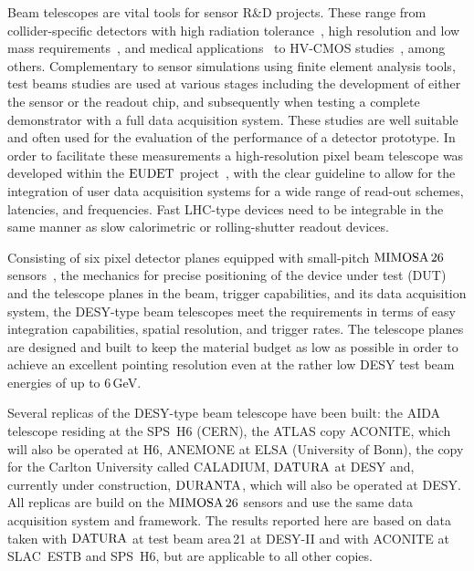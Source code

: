 

Beam telescopes are vital tools for sensor R\&D projects. 
These range from collider-specific detectors with high radiation tolerance~\cite{1748-0221-9-12-C12001,1748-0221-9-12-C12029},
 high resolution and low mass requirements~\cite{1748-0221-10-03-C03044}, and medical applications~\cite{Ballabriga2011S15} to HV-CMOS studies~\cite{1748-0221-7-08-C08002}, among others.
Complementary to sensor simulations using finite element analysis tools, test beams studies are used at various stages including the development of either the sensor or the readout chip,
 and subsequently when testing a complete demonstrator with a full data acquisition system. 
These studies are well suitable and often used for the evaluation of the performance of a detector prototype. %
In order to facilitate these measurements a high-resolution pixel beam telescope was developed within the $\textrm{EUDET}$ project~\cite{ref:eudetreport200902},
 with the clear guideline to allow for the integration of user data acquisition systems for a wide range of read-out schemes, latencies, and frequencies. 
Fast LHC-type devices need to be integrable in the same manner as slow calorimetric or rolling-shutter readout devices. 

Consisting of six pixel detector planes equipped with small-pitch $\textrm{MIMOSA\,26}$ sensors~\cite{HuGuo2010480},
 the mechanics for precise positioning of the device under test (DUT) and the telescope planes in the beam, trigger capabilities, and its data acquisition system, 
 the DESY-type beam telescopes meet the requirements in terms of easy integration capabilities, spatial resolution, and trigger rates. 
The telescope planes are designed and built to keep the material budget as low as possible in order to achieve an excellent pointing resolution
 even at the rather low DESY test beam energies of up to 6\,GeV.

Several replicas of the DESY-type beam telescope have been built:
 the AIDA telescope residing at the SPS~H6 (CERN), the ATLAS copy ACONITE, which will also be operated at H6, ANEMONE at ELSA (University of Bonn), the copy for the Carlton University called CALADIUM, 
 $\textrm{DATURA}$ at DESY and, currently under construction, $\textrm{DURANTA}$, which will also be operated at DESY. 
All replicas are build on the $\textrm{MIMOSA\,26}$ sensors and use the same data acquisition system and framework. 
The results reported here are based on data taken with $\textrm{DATURA}$ at test beam area\,21 at {DESY-II} and with ACONITE at SLAC~ESTB and SPS~H6, but are applicable to all other copies. 

